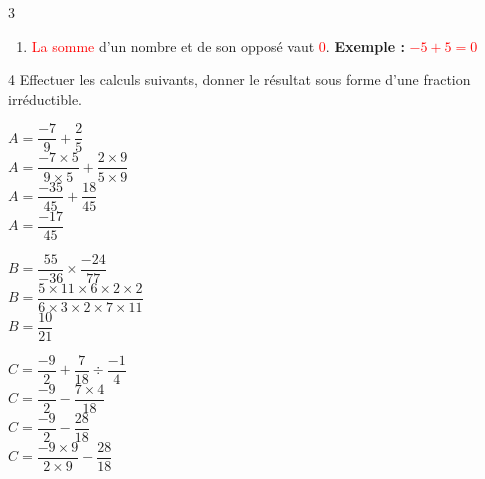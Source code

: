 \documentclass[a4paper]{book}
\begin{document}
{\begin{exerciceNote}{3}
\begin{enumerate}[leftmargin=*]
\begin{enumerate}[leftmargin=*]
                \medskip

                \item \textcolor{red}{La somme} d'un nombre et de son opposé vaut \textcolor{red}{0}. \quad \textbf{Exemple : } \textcolor{red}{$-5+5=0$}

            \end{enumerate}
        \end{enumerate}   
    \end{exerciceNote}


    \begin{exerciceNote}{4}
        Effectuer les calculs suivants, donner le résultat sous forme d'une fraction irréductible.

        \medskip

        \begin{minipage}{0.24\linewidth}
            $A = \dfrac{-7}{9} + \dfrac{2}{5}$ \\[2ex]

            $A = \dfrac{-7\times5}{9\times5}+\dfrac{2\times9}{5\times9}$ \\[2ex]

            $A =\dfrac{-35}{45}+\dfrac{18}{45}$ \\[2ex]

            $A = \dfrac{-17}{45}$
        \end{minipage}
        \hfill\vline\hfill
        \begin{minipage}{0.24\linewidth}
            $B = \dfrac{55}{-36}\times\dfrac{-24}{77}$ \\[2ex]

            $B= \dfrac{5 \times 11 \times 6 \times 2  \times 2}{6 \times 3 \times 2 \times 7 \times 11}$ \\[2ex]

            $B=\dfrac{10}{21}$ 
        \end{minipage}        
        \hfill\vline\hfill
        \begin{minipage}{0.24\linewidth}
            $C = \dfrac{-9}{2}+\dfrac{7}{18}\div\dfrac{-1}{4}$ \\[2ex]

            $C = \dfrac{-9}{2}-\dfrac{7\times4}{18}$ \\[2ex]

            $C = \dfrac{-9}{2}-\dfrac{28}{18}$ \\[2ex]

            $C = \dfrac{-9\times9}{2\times9}-\dfrac{28}{18}$ \\[2ex]


\end{minipage}
\end{exerciceNote}}
\end{document}
